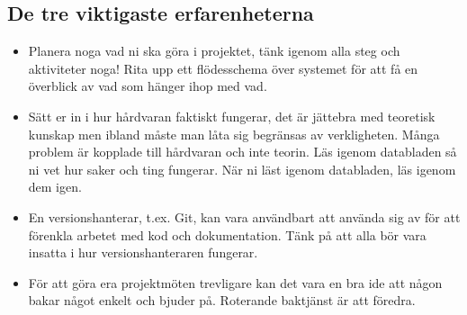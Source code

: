 \documentclass[a4paper,12pt]{article}
\begin{document}
\subsection{De tre viktigaste erfarenheterna}
\begin{itemize}
\item Planera noga vad ni ska göra i projektet, tänk igenom alla steg och
aktiviteter noga! Rita upp ett flödesschema över systemet för att få en
överblick av vad som hänger ihop med vad.
\item Sätt er in i hur hårdvaran faktiskt fungerar, det är jättebra med
teoretisk kunskap men ibland måste man låta sig begränsas av verkligheten.
Många problem är kopplade till hårdvaran och inte teorin. Läs igenom databladen
så ni vet hur saker och ting fungerar. När ni läst igenom databladen, läs igenom
dem igen. 
\item En versionshanterar, t.ex. Git, kan vara användbart att använda sig av för
att förenkla arbetet med kod och dokumentation. Tänk på att alla bör vara
insatta i hur versionshanteraren fungerar. 
\item För att göra era projektmöten trevligare kan det vara en bra ide att någon
bakar något enkelt och bjuder på. Roterande baktjänst är att föredra.
\end{itemize}
\end{document}
